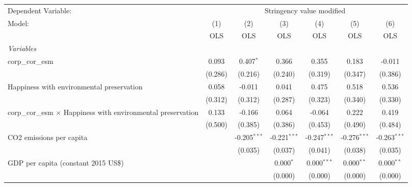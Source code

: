 
\begingroup
\centering
\begin{tabular}{lcccccc}
   \toprule
   Dependent Variable: & \multicolumn{6}{c}{Stringency value modified}\\
   Model:                                                               & (1)     & (2)            & (3)            & (4)            & (5)            & (6)\\  
                                                                        &  OLS    & OLS            & OLS            & OLS            & OLS            & OLS\\  
   \midrule
   \emph{Variables}\\
   corp\_cor\_esm                                                       & 0.093   & 0.407$^{*}$    & 0.366          & 0.355          & 0.183          & -0.011\\   
                                                                        & (0.286) & (0.216)        & (0.240)        & (0.319)        & (0.347)        & (0.386)\\   
   Happiness with environmental preservation                            & 0.058   & -0.011         & 0.041          & 0.475          & 0.518          & 0.536\\   
                                                                        & (0.312) & (0.312)        & (0.287)        & (0.323)        & (0.340)        & (0.330)\\   
   corp\_cor\_esm $\times$ Happiness with environmental preservation    & 0.133   & -0.166         & 0.064          & -0.064         & 0.222          & 0.419\\   
                                                                        & (0.500) & (0.385)        & (0.386)        & (0.453)        & (0.490)        & (0.484)\\   
   CO2 emissions per capita                                             &         & -0.205$^{***}$ & -0.221$^{***}$ & -0.247$^{***}$ & -0.276$^{***}$ & -0.263$^{***}$\\   
                                                                        &         & (0.035)        & (0.037)        & (0.041)        & (0.038)        & (0.035)\\   
   GDP per capita (constant 2015 US\$)                                  &         &                & 0.000$^{*}$    & 0.000$^{***}$  & 0.000$^{**}$   & 0.000$^{**}$\\   
                                                                        &         &                & (0.000)        & (0.000)        & (0.000)        & (0.000)\\   

\end{tabular}
